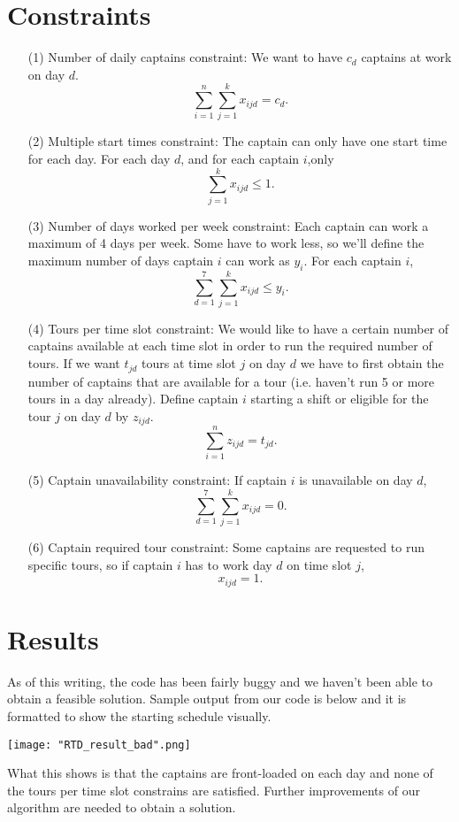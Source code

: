 \documentclass[12pt]{article}
\begin{document}
\section*{Constraints}
\begin{enumerate}
\item[(1)] Number of daily captains constraint: We want to have $c_d$ captains at work on day $d$.
$$\sum_{i = 1}^{n}\sum_{j = 1}^{k}{x_{ijd}} = c_d.$$
\item[(2)] Multiple start times constraint: The captain can only have one start time for each day. 
For each day $d$, and for each captain $i$,only 
$$\sum_{j = 1}^{k}{x_{ijd}} \le 1.$$
\item[(3)] Number of days worked per week constraint: Each captain can work a maximum of 4 days per week. Some have to work less, so we'll define the maximum number of days captain $i$ can work as $y_i$.
For each captain $i$,
$$\sum_{d = 1}^{7}\sum_{j = 1}^{k}{x_{ijd}} \le y_i.$$
\item[(4)] Tours per time slot constraint: We would like to have a certain number of captains available at each time slot in order to run the required number of tours. If we want $t_{jd}$ tours at time slot $j$ on day $d$ we have to first obtain the number of captains that are available for a tour (i.e. haven't run 5 or more tours in a day already). Define captain $i$ starting a shift or eligible for the tour $j$ on day $d$ by $z_{ijd}$.
$$\sum_{i = 1}^{n}{z_{ijd}} = t_{jd}.$$
\item[(5)] Captain unavailability constraint: If captain $i$ is unavailable on day $d$,
$$\sum_{d = 1}^{7}\sum_{j = 1}^{k}{x_{ijd}} = 0.$$
\item[(6)] Captain required tour constraint: Some captains are requested to run specific tours, so if captain $i$ has to work 
day $d$ on time slot $j$,
$$x_{ijd} = 1.$$
\end{enumerate}

\section*{Results} As of this writing, the code has been fairly buggy and we haven't been able to obtain a feasible solution. Sample output from our code is below and it is formatted to show the starting schedule visually. 
\begin{center}
\texttt{[image: "RTD\_result\_bad".png]}
\end{center}
What this shows is that the captains are front-loaded on each day and none of the tours per time slot constrains are satisfied. Further improvements of our algorithm are needed to obtain a solution. 
\end{document}
